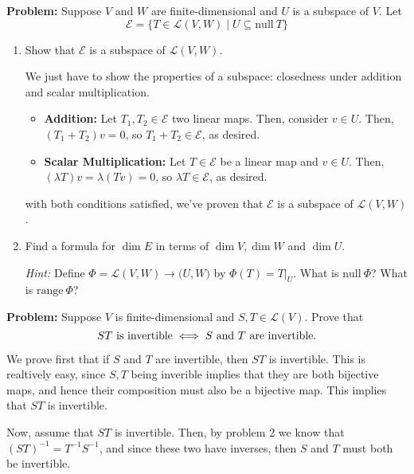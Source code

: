 \documentclass[10pt]{article}
\newcommand{\range}{\mathrm{range \ }}
\renewcommand{\null}{\mathrm{null \ }}
\newenvironment{problem}{\textbf{Problem:}}{}
\begin{document}
	\begin{problem}
		Suppose \( V \) and \( W \) are finite-dimensional and \( U \) is a subspace of \( V \). 
		Let 
		\[
		\mathcal E = \{T \in \mathcal L(V, W) \mid U \subseteq \null T\} 
		\] 
		\begin{enumerate}[label=\alph*)]
			\item Show that \( \mathcal E \) is a subspace of \( \mathcal L(V, W) \). 

				\begin{solution}
					We just have to show the properties of a subspace: closedness under addition and scalar 
					multiplication.
					\begin{itemize}
						\item \textbf{Addition:} Let \( T_1, T_2 \in \mathcal E\) two linear maps. Then, 
							consider \( v \in U \). Then, \( (T_1 + T_2)v = 0 \), so  \( T_1 + T_2 \in \mathcal E \), 
							as desired. 
						\item \textbf{Scalar Multiplication:} Let \( T \in \mathcal E\) be a linear map and 
							\( v \in U \). Then, \( (\lambda T)v = \lambda (Tv) = 0 \), so 
							\( \lambda T \in \mathcal E \), as desired. 
					\end{itemize}
					with both conditions satisfied, we've proven that \( \mathcal E \) is a subspace of 
					\( \mathcal L(V, W) \).
				\end{solution}
			\item Find a formula for \( \dim E \) in terms of \( \dim V, \dim W \) and \( \dim U \). 
				
				\textit{Hint:} Define \( \Phi = \mathcal L(V, W) \to \mathcal (U, W) \) by 
				\( \Phi(T) = T\vert_U \). What is \( \null \Phi \)? What is \( \range \Phi \)? 

				\begin{solution}
				\end{solution}
		\end{enumerate}
	\end{problem}

	\begin{problem}
		Suppose \( V \) is finite-dimensional and \( S, T \in \mathcal L(V) \). Prove that 
		\[
		\text{\( ST \) is invertible} \iff \text{\( S \) and \( T \) are invertible.}
		\] 
	\end{problem}

	\begin{solution}
		We prove first that if \( S \) and \( T \) are invertible, then \( ST  \) is invertible. This is realtively 
		easy, since \( S, T \) being inverible implies that they are both bijective maps, and hence their 
		composition must also be a bijective map. This implies that \( ST \) is invertible.  

		Now, assume that \( ST  \) is invertible. Then, by problem 2 we know that \( (ST)^{-1} = T^{-1} S^{-1} \), 
		and since these two have inverses, then \( S \) and \( T \) must both be invertible.  
	\end{solution}
\end{document}
